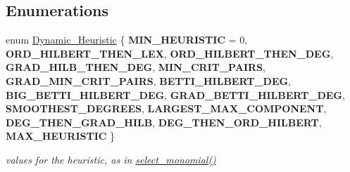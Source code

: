 \subsection*{Enumerations}
\begin{DoxyCompactItemize}
\item 
enum \hyperlink{group___g_b_computation_ga819b1fd40d9a40ff303df3b90647ecb0}{Dynamic\+\_\+\+Heuristic} \{ \newline
{\bfseries M\+I\+N\+\_\+\+H\+E\+U\+R\+I\+S\+T\+IC} = 0, 
{\bfseries O\+R\+D\+\_\+\+H\+I\+L\+B\+E\+R\+T\+\_\+\+T\+H\+E\+N\+\_\+\+L\+EX}, 
{\bfseries O\+R\+D\+\_\+\+H\+I\+L\+B\+E\+R\+T\+\_\+\+T\+H\+E\+N\+\_\+\+D\+EG}, 
{\bfseries G\+R\+A\+D\+\_\+\+H\+I\+L\+B\+\_\+\+T\+H\+E\+N\+\_\+\+D\+EG}, 
\newline
{\bfseries M\+I\+N\+\_\+\+C\+R\+I\+T\+\_\+\+P\+A\+I\+RS}, 
{\bfseries G\+R\+A\+D\+\_\+\+M\+I\+N\+\_\+\+C\+R\+I\+T\+\_\+\+P\+A\+I\+RS}, 
{\bfseries B\+E\+T\+T\+I\+\_\+\+H\+I\+L\+B\+E\+R\+T\+\_\+\+D\+EG}, 
{\bfseries B\+I\+G\+\_\+\+B\+E\+T\+T\+I\+\_\+\+H\+I\+L\+B\+E\+R\+T\+\_\+\+D\+EG}, 
\newline
{\bfseries G\+R\+A\+D\+\_\+\+B\+E\+T\+T\+I\+\_\+\+H\+I\+L\+B\+E\+R\+T\+\_\+\+D\+EG}, 
{\bfseries S\+M\+O\+O\+T\+H\+E\+S\+T\+\_\+\+D\+E\+G\+R\+E\+ES}, 
{\bfseries L\+A\+R\+G\+E\+S\+T\+\_\+\+M\+A\+X\+\_\+\+C\+O\+M\+P\+O\+N\+E\+NT}, 
{\bfseries D\+E\+G\+\_\+\+T\+H\+E\+N\+\_\+\+G\+R\+A\+D\+\_\+\+H\+I\+LB}, 
\newline
{\bfseries D\+E\+G\+\_\+\+T\+H\+E\+N\+\_\+\+O\+R\+D\+\_\+\+H\+I\+L\+B\+E\+RT}, 
{\bfseries M\+A\+X\+\_\+\+H\+E\+U\+R\+I\+S\+T\+IC}
 \}\begin{DoxyCompactList}\small\item\em values for the heuristic, as in {\ttfamily \hyperlink{group___g_b_computation_gaa01d88c431b84deabf51ee116d7d2a0e}{select\+\_\+monomial()}} \end{DoxyCompactList}
\end{DoxyCompactItemize}
